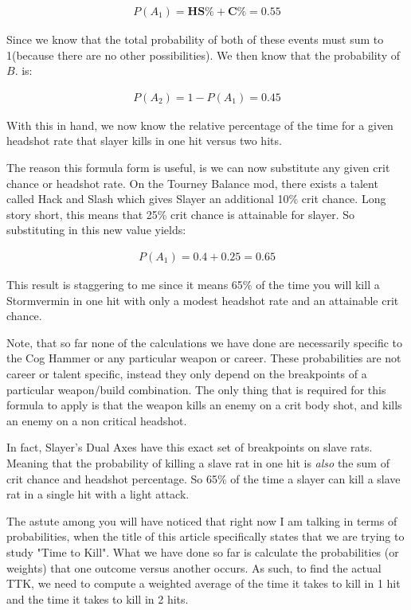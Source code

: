 \documentclass{article}
\begin{document}
\begin{align*}
P(A_1) = \mathbf{HS\%} + \mathbf{C\%} = 0.55
\end{align*}

Since we know that the total probability of both of these events must sum to 1(because there are no other possibilities). We then know that the probability of $B.$ is:

\begin{align*}
P(A_2) = 1-P(A_1) = 0.45
\end{align*}

With this in hand, we now know the relative percentage of the time for a given headshot rate that  slayer kills in one hit versus two hits.

The reason this formula form is useful, is we can now substitute any given crit chance or headshot rate. On the Tourney Balance mod, there exists a talent called Hack and Slash which gives Slayer an additional 10\% crit chance. Long story short, this means that 25\% crit chance is attainable for slayer. So substituting in this new value yields:

\begin{align*}
P(A_1) = 0.4 + 0.25 = 0.65
\end{align*}

This result is staggering to me since it means 65\% of the time you will kill a Stormvermin in one hit with only a modest headshot rate and an attainable crit chance.

Note, that so far none of the calculations we have done are necessarily specific to the Cog Hammer or any particular weapon or career. These probabilities are not career or talent specific, instead they only depend on the breakpoints of a particular weapon/build combination. The only thing that is required for this formula to apply is that the weapon kills an enemy on a crit body shot, and kills an enemy on a non critical headshot.

In fact, Slayer's Dual Axes have this exact set of breakpoints on slave rats. Meaning that the probability of killing a slave rat in one hit is \emph{also} the sum of crit chance and headshot percentage. So 65\% of the time a slayer can kill a slave rat in a single hit with a light attack.

The astute among you will have noticed that right now I am talking in terms of probabilities, when the title of this article specifically states that we are trying to study "Time to Kill". What we have done so far is calculate the probabilities (or weights) that one outcome versus another occurs. As such, to find the actual TTK, we need to compute a weighted average of the time it takes to kill in 1 hit and the time it takes to kill in 2 hits.
\end{document}
